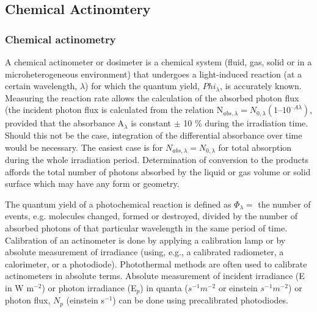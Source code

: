 \documentclass[ignorenonframetext]{beamer}
\begin{document}
\subsection{Chemical Actinomtery}
\begin{frame}
\frametitle{Chemical actinometry}
A chemical actinometer or dosimeter is a chemical system (fluid, gas, solid or in a microheterogeneous
environment) that undergoes a light-induced reaction (at a certain wavelength, \(\lambda\)) for which the quantum yield, \(Phi_\lambda\), is accurately known. Measuring the reaction rate allows the calculation of the absorbed photon flux (the incident photon flux is calculated from the relation N\(_{abs,\lambda} = N_{0,\lambda} (1 – 10^{–A\lambda})\), provided that the absorbance A\(_\lambda\) is constant \(\pm\) 10 \% during the irradiation time. Should this not be the case, integration of the differential absorbance over time would be necessary. The easiest case is for \(N_{abs,\lambda} = N_{0,\lambda}\) for total absorption during the whole irradiation period. Determination of conversion to the products affords the total number of photons absorbed by the liquid or gas volume or solid surface which may have any form or geometry.
\end{frame}

 The quantum yield of a photochemical reaction is defined as \(\Phi_\lambda =\) the number of events, e.g. molecules
changed, formed or destroyed, divided by the number of absorbed photons of that particular wavelength in the same
period of time.
 Calibration of an actinometer is done by applying a calibration lamp or by absolute measurement of irradiance
(using, e.g., a calibrated radiometer, a calorimeter, or a photodiode). Photothermal methods are often used to calibrate
actinometers in absolute terms.
 Absolute measurement of incident irradiance (E in W m\(^{-2}\)) or photon irradiance (E\(_p\)) in quanta (\(s^{-1} m^{-2}\) or einstein \(s^{-1} m^{-2}\)) or photon flux, \(N_p\) (einstein s\(^{-1}\)) can be done using precalibrated photodiodes. 


\end{document}
